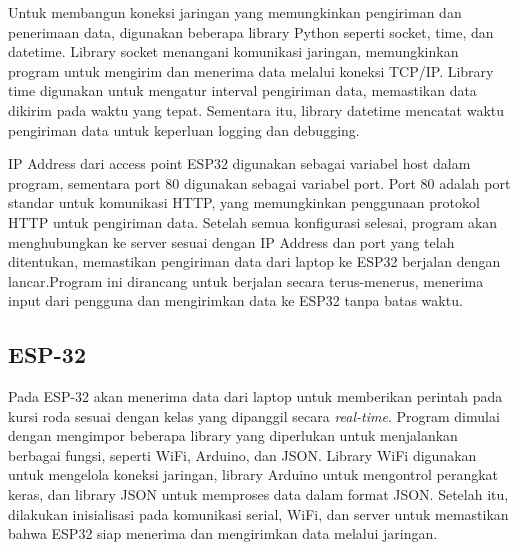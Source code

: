 Untuk membangun koneksi jaringan yang memungkinkan pengiriman dan penerimaan data, digunakan beberapa library Python seperti socket, time, dan datetime. Library socket menangani komunikasi jaringan, memungkinkan program untuk mengirim dan menerima data melalui koneksi TCP/IP. Library time digunakan untuk mengatur interval pengiriman data, memastikan data dikirim pada waktu yang tepat. Sementara itu, library datetime mencatat waktu pengiriman data untuk keperluan logging dan debugging.

IP Address dari access point ESP32 digunakan sebagai variabel host dalam program, sementara port 80 digunakan sebagai variabel port. Port 80 adalah port standar untuk komunikasi HTTP, yang memungkinkan penggunaan protokol HTTP untuk pengiriman data. Setelah semua konfigurasi selesai, program akan menghubungkan ke server sesuai dengan IP Address dan port yang telah ditentukan, memastikan pengiriman data dari laptop ke ESP32 berjalan dengan lancar.Program ini dirancang untuk berjalan secara terus-menerus, menerima input dari pengguna dan mengirimkan data ke ESP32 tanpa batas waktu.

\subsection{ESP-32}
Pada ESP-32 akan menerima data dari laptop untuk memberikan perintah pada kursi roda sesuai dengan kelas yang dipanggil secara \emph{real-time}. Program dimulai dengan mengimpor beberapa library yang diperlukan untuk menjalankan berbagai fungsi, seperti WiFi, Arduino, dan JSON. Library WiFi digunakan untuk mengelola koneksi jaringan, library Arduino untuk mengontrol perangkat keras, dan library JSON untuk memproses data dalam format JSON. Setelah itu, dilakukan inisialisasi pada komunikasi serial, WiFi, dan server untuk memastikan bahwa ESP32 siap menerima dan mengirimkan data melalui jaringan.

